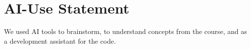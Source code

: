 \section{AI-Use Statement}
\label{app:ai}

We used AI tools to brainstorm, to understand concepts from the course, and as a development
assistant for the code.
